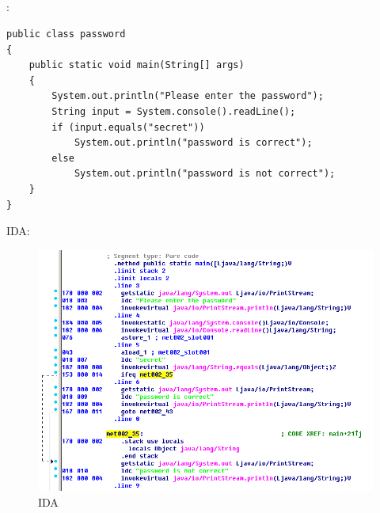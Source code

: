\subsection{}

:

\begin{lstlisting}
public class password
{
	public static void main(String[] args)
	{
		System.out.println("Please enter the password");
		String input = System.console().readLine();
		if (input.equals("secret"))
			System.out.println("password is correct");
		else
			System.out.println("password is not correct");
	}
}
\end{lstlisting}

 IDA:

\begin{figure}[H]
\centering
\includegraphics[scale=\FigScale]{Java_and_NET/java/13_patching/2/1.png}
\caption{IDA}
\end{figure}

